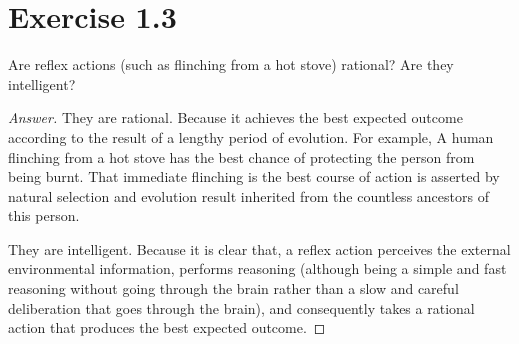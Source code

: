 \documentclass{amsbook}
\theoremstyle{definition}
\theoremstyle{remark}
\numberwithin{section}{chapter}
\numberwithin{equation}{chapter}
\begin{document}
\section{Exercise 1.3}
Are reflex actions (such as flinching from a hot stove) rational? Are they intelligent?
\begin{proof}[Answer]
They are rational. Because it achieves the best expected outcome according to the result of a lengthy period of evolution. For example, A human flinching from a hot stove has the best chance of protecting the person from being burnt. That immediate flinching is the best course of action is asserted by natural selection and evolution result inherited from the countless ancestors of this person.

They are intelligent. Because it is clear that, a reflex action perceives the external environmental information, performs reasoning (although being a simple and fast reasoning without going through the brain rather than a slow and careful deliberation that goes through the brain), and consequently takes a rational action that produces the best expected outcome.
\end{proof}
\end{document}
